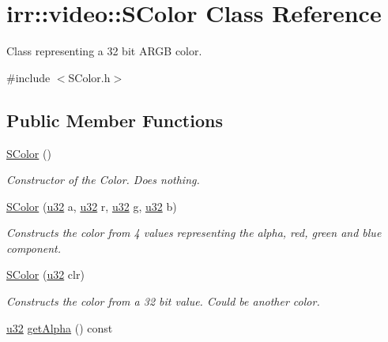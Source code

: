 \hypertarget{classirr_1_1video_1_1SColor}{}\section{irr\+:\+:video\+:\+:S\+Color Class Reference}
\label{classirr_1_1video_1_1SColor}


Class representing a 32 bit A\+R\+GB color.  




{\ttfamily \#include $<$S\+Color.\+h$>$}

\subsection*{Public Member Functions}
\begin{DoxyCompactItemize}
\item 
\hyperlink{classirr_1_1video_1_1SColor_ab001c0c2515ff5f8a0b324d1345485f4}{S\+Color} ()
\begin{DoxyCompactList}\small\item\em Constructor of the Color. Does nothing. \end{DoxyCompactList}\item 
\hyperlink{classirr_1_1video_1_1SColor_aa2ca1fcb9b11375282bb407b635b3dd6}{S\+Color} (\hyperlink{namespaceirr_a0416a53257075833e7002efd0a18e804}{u32} a, \hyperlink{namespaceirr_a0416a53257075833e7002efd0a18e804}{u32} r, \hyperlink{namespaceirr_a0416a53257075833e7002efd0a18e804}{u32} g, \hyperlink{namespaceirr_a0416a53257075833e7002efd0a18e804}{u32} b)
\begin{DoxyCompactList}\small\item\em Constructs the color from 4 values representing the alpha, red, green and blue component. \end{DoxyCompactList}\item 
\mbox{\label{classirr_1_1video_1_1SColor_a56dd5677c3e36d3b33d5d796be2597da}} 
\hyperlink{classirr_1_1video_1_1SColor_a56dd5677c3e36d3b33d5d796be2597da}{S\+Color} (\hyperlink{namespaceirr_a0416a53257075833e7002efd0a18e804}{u32} clr)
\begin{DoxyCompactList}\small\item\em Constructs the color from a 32 bit value. Could be another color. \end{DoxyCompactList}\item 
\hyperlink{namespaceirr_a0416a53257075833e7002efd0a18e804}{u32} \hyperlink{classirr_1_1video_1_1SColor_a8b0bcff9036b06e3483978a84a924b91}{get\+Alpha} () const

\end{DoxyCompactItemize}

